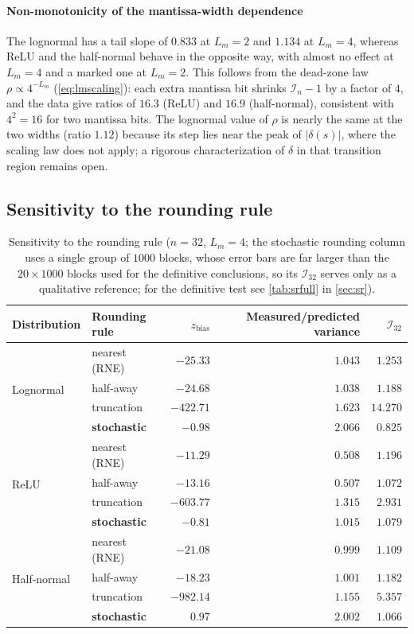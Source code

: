 \documentclass[twocolumn,review,hidelinks,oneeqnum,onetabnum,onefignum,onethmnum]{siamart251216}
\begin{document}
\paragraph{Non-monotonicity of the mantissa-width dependence} The lognormal has a
tail slope of $0.833$ at $L_m=2$ and $1.134$ at $L_m=4$, whereas ReLU and the
half-normal behave in the opposite way, with almost no effect at $L_m=4$ and a
marked one at $L_m=2$. This follows from the dead-zone law
$\rho\propto4^{-L_m}$ (\cref{eq:lmscaling}): each extra mantissa bit shrinks
$\mathcal I_n-1$ by a factor of $4$, and the data give ratios of $16.3$ (ReLU) and
$16.9$ (half-normal), consistent with $4^2=16$ for two mantissa bits. The
lognormal value of $\rho$ is nearly the same at the two widths (ratio $1.12$)
because its step lies near the peak of $|\delta(s)|$, where the scaling law does
not apply; a rigorous characterization of $\delta$ in that transition region
remains open.

\subsection{Sensitivity to the rounding rule}
\label{sec:modes}

\begin{table}[!tb]
\centering
\caption{Sensitivity to the rounding rule ($n=32$, $L_m=4$; the stochastic
rounding column uses a single group of $1000$ blocks, whose error bars are far
larger than the $20\times1000$ blocks used for the definitive conclusions, so its
$\mathcal I_{32}$ serves only as a qualitative reference; for the definitive test
see \cref{tab:srfull} in \cref{sec:sr}).}
\label{tab:modes}
\setlength{\tabcolsep}{4pt}
\small
\begin{tabular}{@{}llrrr@{}}
\toprule
Distribution & Rounding rule & $z_{\text{bias}}$ & Measured/predicted variance & $\mathcal I_{32}$ \\
\midrule
\multirow{4}{*}{Lognormal}
 & nearest (RNE) & $-25.33$ & $1.043$ & $1.253$ \\
 & half-away & $-24.68$ & $1.038$ & $1.188$ \\
 & truncation & $\mathbf{-422.71}$ & $1.623$ & $14.270$ \\
 & \textbf{stochastic} & $\mathbf{-0.98}$ & $2.066$ & $0.825$ \\
\midrule
\multirow{4}{*}{ReLU}
 & nearest (RNE) & $-11.29$ & $0.508$ & $1.196$ \\
 & half-away & $-13.16$ & $0.507$ & $1.072$ \\
 & truncation & $\mathbf{-603.77}$ & $1.315$ & $2.931$ \\
 & \textbf{stochastic} & $\mathbf{-0.81}$ & $1.015$ & $1.079$ \\
\midrule
\multirow{4}{*}{Half-normal}
 & nearest (RNE) & $-21.08$ & $0.999$ & $1.109$ \\
 & half-away & $-18.23$ & $1.001$ & $1.182$ \\
 & truncation & $\mathbf{-982.14}$ & $1.155$ & $5.357$ \\
 & \textbf{stochastic} & $\mathbf{0.97}$ & $2.002$ & $1.066$ \\
\bottomrule
\end{tabular}
\end{table}
\end{document}
